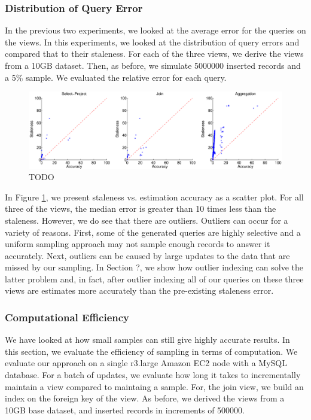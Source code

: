 \subsubsection{Distribution of Query Error}
In the previous two experiments, we looked at the average error for the queries on the views.
In this experiments, we looked at the distribution of query errors and compared that to their staleness.
For each of the three views, we derive the views from a 10GB dataset.
Then, as before, we simulate 5000000 inserted records and a 5\% sample.
We evaluated the relative error for each query.

\begin{figure}[ht!]
\label{exp3dist}
\centering
 \includegraphics[width=\textwidth]{exp/exp3-query-error-dist.eps}
 \caption{TODO}
\end{figure}

In Figure \ref{exp3dist}, we present staleness vs. estimation accuracy as a scatter plot.
For all three of the views, the median error is greater than 10 times less than the staleness. 
However, we do see that there are outliers.
Outliers can occur for a variety of reasons.
First, some of the generated queries are highly selective and a uniform sampling approach may not sample enough records to answer it accurately.
Next, outliers can be caused by large updates to the data that are missed by our sampling.
In Section ?, we show how outlier indexing can solve the latter problem and, in fact, after outlier indexing all of our queries on these three views are estimates more accurately than the pre-existing staleness error.

\subsubsection{Computational Efficiency}
We have looked at how small samples can still give highly accurate results.
In this section, we evaluate the efficiency of sampling in terms of computation.
We evaluate our approach on a single r3.large Amazon EC2 node with a MySQL database.
For a batch of updates, we evaluate how long it takes to incrementally maintain a view compared to maintaing a sample.
For, the join view, we build an index on the foreign key of the view.
As before, we derived the views from a 10GB base dataset, and inserted records in increments of 500000.

